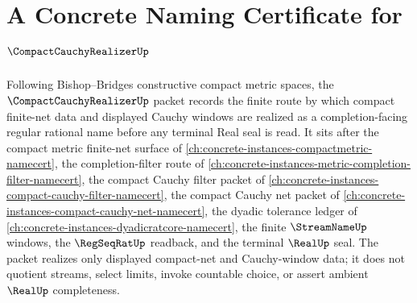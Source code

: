 \chapter{A Concrete Naming Certificate for $\CompactCauchyRealizerUp$}
\label{ch:concrete-instances-compact-cauchy-realizer-namecert}

Following Bishop--Bridges constructive compact metric spaces, the $\CompactCauchyRealizerUp$ packet records the finite route by which compact finite-net data and displayed Cauchy windows are realized as a completion-facing regular rational name before any terminal Real seal is read. It sits after the compact metric finite-net surface of \autoref{ch:concrete-instances-compactmetric-namecert}, the completion-filter route of \autoref{ch:concrete-instances-metric-completion-filter-namecert}, the compact Cauchy filter packet of \autoref{ch:concrete-instances-compact-cauchy-filter-namecert}, the compact Cauchy net packet of \autoref{ch:concrete-instances-compact-cauchy-net-namecert}, the dyadic tolerance ledger of \autoref{ch:concrete-instances-dyadicratcore-namecert}, the finite $\StreamNameUp$ windows, the $\RegSeqRatUp$ readback, and the terminal $\RealUp$ seal. The packet realizes only displayed compact-net and Cauchy-window data; it does not quotient streams, select limits, invoke countable choice, or assert ambient $\RealUp$ completeness.

